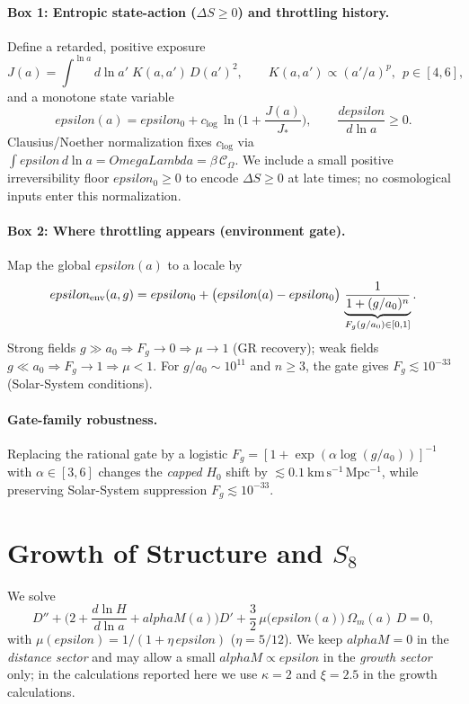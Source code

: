 \documentclass[aps,prd,onecolumn,superscriptaddress,nofootinbib]{revtex4-2}
\def\OmL{OmegaLambda}%
\def\alphaM{alphaM}%
\def\eps{epsilon}%
\newcommand{\OmL}{\Omega_\Lambda}
\newcommand{\alphaM}{\alpha_M}
\newcommand{\eps}{\varepsilon}
\begin{document}
\paragraph*{Box 1: Entropic state-action ($\Delta S\ge 0$) and throttling history.}
Define a retarded, positive exposure
\begin{equation}
J(a)=\int^{\ln a}\!d\ln a'\;K(a,a')\,D(a')^2,\qquad K(a,a')\propto (a'/a)^p,\ \ p\in[4,6],
\end{equation}
and a monotone state variable
\begin{equation}
\eps(a)=\eps_0+c_{\log}\,\ln\!\Big(1+\frac{J(a)}{J_*}\Big),\qquad \frac{d\eps}{d\ln a}\ge 0.
\end{equation}
Clausius/Noether normalization fixes $c_{\log}$ via $\int \eps\,d\ln a=\OmL=\beta\,\mathcal C_\Omega$. We include a small positive irreversibility floor $\eps_0\ge 0$ to encode $\Delta S\ge 0$ at late times; no cosmological inputs enter this normalization.

\paragraph*{Box 2: Where throttling appears (environment gate).}
Map the global $\eps(a)$ to a locale by
\begin{equation}
\eps_{\rm env}(a,g)=\eps_0+\big(\eps(a)-\eps_0\big)\,\underbrace{\frac{1}{1+(g/a_0)^n}}_{F_g(g/a_0)\in[0,1]} .
\end{equation}
Strong fields $g\gg a_0\Rightarrow F_g\to 0\Rightarrow \mu\to 1$ (GR recovery); weak fields $g\ll a_0\Rightarrow F_g\to 1\Rightarrow \mu<1$. For $g/a_0\sim 10^{11}$ and $n\ge 3$, the gate gives $F_g\lesssim 10^{-33}$ (Solar-System conditions).

\paragraph*{Gate-family robustness.}
Replacing the rational gate by a logistic \(F_g=[1+\exp(\alpha\log(g/a_0))]^{-1}\) with \(\alpha\in[3,6]\) changes the \emph{capped} $H_0$ shift by $\lesssim 0.1\ \mathrm{km\,s^{-1}\,Mpc^{-1}}$, while preserving Solar-System suppression \(F_g\lesssim 10^{-33}\).

\section{Growth of Structure and \texorpdfstring{$S_8$}{S8}}
\label{sec:growth}
We solve
\begin{equation}
D''+\Big(2+\frac{d\ln H}{d\ln a}+\alphaM(a)\Big)D' + \frac{3}{2}\,\mu\big(\eps(a)\big)\,\Omega_m(a)\,D=0,
\end{equation}
with $\mu(\eps)=1/(1+\eta\,\eps)$ ($\eta=5/12$). We keep $\alphaM=0$ in the \emph{distance sector} and may allow a small $\alphaM\propto \eps$ in the \emph{growth sector} only; in the calculations reported here we use $\kappa=2$ and $\xi=2.5$ in the growth calculations.
\end{document}
